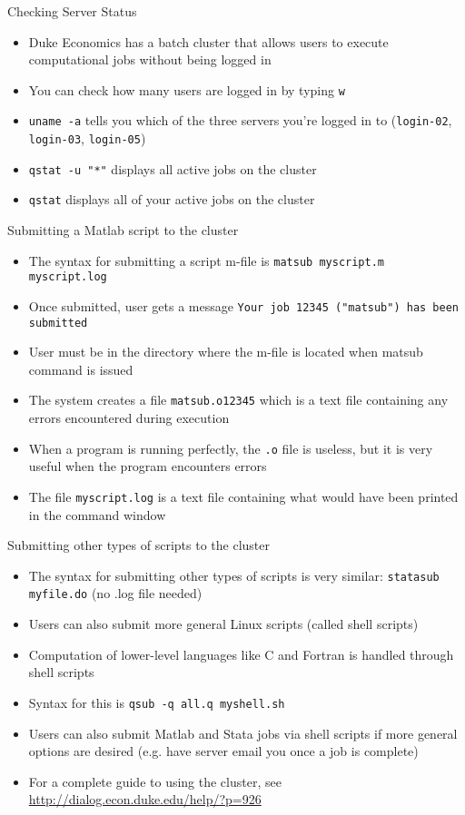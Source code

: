 \documentclass[english,xcolor=dvipsnames]{beamer}
\begin{document}
\begin{frame}{Checking Server Status}
\begin{itemize}
	\item Duke Economics has a batch cluster that allows users to execute computational jobs without being logged in
	\item You can check how many users are logged in by typing \texttt{w}
	\item \texttt{uname -a} tells you which of the three servers you're logged in to (\texttt{login-02}, \texttt{login-03}, \texttt{login-05})
	\item \texttt{qstat -u "*"} displays all active jobs on the cluster
	\item \texttt{qstat} displays all of your active jobs on the cluster
\end{itemize}
\end{frame}

\begin{frame}{Submitting a Matlab script to the cluster}
\begin{itemize}
	\item The syntax for submitting a script m-file is \texttt{matsub myscript.m myscript.log}
	\item Once submitted, user gets a message \texttt{Your job 12345 ("matsub") has been submitted}
	\item User must be in the directory where the m-file is located when matsub command is issued
	\item The system creates a file \texttt{matsub.o12345} which is a text file containing any errors encountered during execution
	\item When a program is running perfectly, the \texttt{.o} file is useless, but it is very useful when the program encounters errors
	\item The file \texttt{myscript.log} is a text file containing what would have been printed in the command window
\end{itemize}
\end{frame}

\begin{frame}{Submitting other types of scripts to the cluster}
\begin{itemize}
	\item The syntax for submitting other types of scripts is very similar: \texttt{statasub myfile.do} (no .log file needed)
	\item Users can also submit more general Linux scripts (called shell scripts)
	\item Computation of lower-level languages like C and Fortran is handled through shell scripts
	\item Syntax for this is \texttt{qsub -q all.q myshell.sh}
	\item Users can also submit Matlab and Stata jobs via shell scripts if more general options are desired (e.g. have server email you once a job is complete)
	\item For a complete guide to using the cluster, see \url{http://dialog.econ.duke.edu/help/?p=926}
\end{itemize}
\end{frame}
\end{document}

